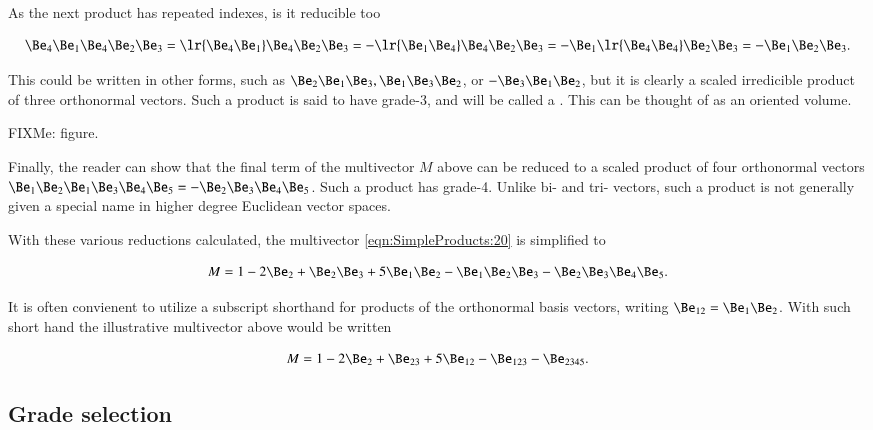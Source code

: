 As the next product has repeated indexes, is it reducible too

\begin{dmath}\label{eqn:SimpleProducts:100}
\Be_4 \Be_1 \Be_4 \Be_2 \Be_3
=
\lr{ \Be_4 \Be_1} \Be_4 \Be_2 \Be_3
=
-\lr{ \Be_1 \Be_4} \Be_4 \Be_2 \Be_3
=
- \Be_1 \lr{ \Be_4 \Be_4 } \Be_2 \Be_3
=
- \Be_1 \Be_2 \Be_3.
\end{dmath}

This could be written in other forms, such as \( \Be_2 \Be_1 \Be_3, \Be_1 \Be_3 \Be_2 \), or \( -\Be_3 \Be_1 \Be_2 \), but it is clearly a scaled irredicible product of three orthonormal vectors.  Such a product is said to have grade-3, and will be called a .  This can be thought of as an oriented volume.

FIXMe: figure.

Finally, the reader can show that the final term of the multivector \( M \) above can be reduced to a scaled product of four orthonormal vectors \( \Be_1 \Be_2 \Be_1 \Be_3 \Be_4 \Be_5 = -\Be_2 \Be_3 \Be_4 \Be_5 \).  Such a product has grade-4.  Unlike bi- and tri- vectors, such a product is not generally given a special name in higher degree Euclidean vector spaces.

With these various reductions calculated, the multivector \cref{eqn:SimpleProducts:20} is simplified to

\begin{dmath}\label{eqn:SimpleProducts:120}
M = 1 - 2 \Be_2  + \Be_2 \Be_3 + 5 \Be_1 \Be_2 - \Be_1 \Be_2 \Be_3 -\Be_2 \Be_3 \Be_4 \Be_5.
\end{dmath}

It is often convienent to utilize a subscript shorthand for products of the orthonormal basis vectors, writing \( \Be_{12} = \Be_1 \Be_2 \).  With such short hand the illustrative multivector above would be written

\begin{dmath}\label{eqn:SimpleProducts:120}
M = 1 - 2 \Be_2  + \Be_{23} + 5 \Be_{12} - \Be_{123} -\Be_{2345}.
\end{dmath}

\subsection{Grade selection}

